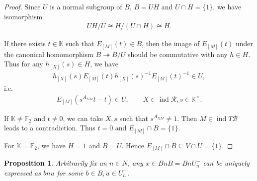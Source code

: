 \documentclass[12pt]{amsart}
\newtheorem{proposition}[theorem]{Proposition}
\begin{document}
\begin{proof}
    Since $U$ is a normal subgroup of $B$, $B= UH$ and $U\cap H = \{1\}$, we have isomorphism
    \begin{align*}
        UH/U \cong H/(U\cap H) \cong H.
    \end{align*}
    
    If there exists $t\in \mathbb{K}$ such that $E_{[M]}(t) \in B$, then the image of $E_{[M]}(t)$ under the canonical homomorphism $B\twoheadrightarrow B/U$ should be commutative with any $h\in H$.
    Thus for any $ h_{[X]}(s) \in H$, we have
    \begin{align*}
        h_{[X]}(s) E_{[M]}(t) h_{[X]}(s)^{-1} E_{[M]}(t)^{-1}  \in U,
    \end{align*}
    i.e.
    \begin{align*}
        E_{[M]}(s^{A_{XM}}t-t) \in U, \qquad  X\in \operatorname{ind}\mathcal{R},  s\in \mathbb{K}^{\times}.
    \end{align*}
    
    If $\mathbb{K}\neq \mathbb{F}_2$ and $t\neq 0$, we can take $X,s$ such that $s^{A_{XM}} \neq 1$.
    Then $M \in \operatorname{ind}T\mathcal{B}$ leads to a contradiction.
    Thus $t=0$ and $E_{[M]}\cap B = \{1\}$.

    For $\mathbb{K} = \mathbb{F}_2$, we have $H=1$ and $B=U$. 
    Hence $E_{[M]}\cap B \subseteq  V\cap U =\{1\}$.
\end{proof}


\begin{proposition}
    Arbitrarily fix an $n\in N$, any $x\in BnB=BnU_{\overline{n}}^-$ can be uniquely expressed as $bnu$ for some $b\in B,u\in U_{\overline{n}}^-$.
\end{proposition}
\end{document}
